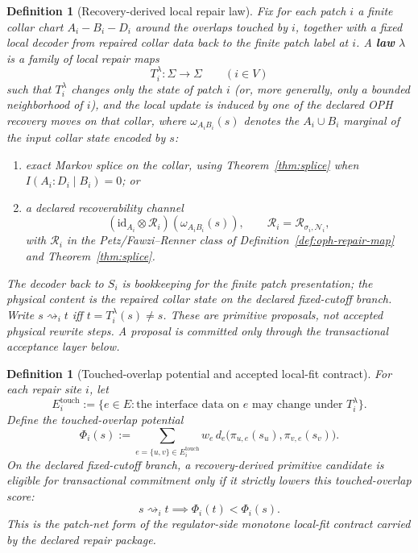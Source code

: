 \documentclass[11pt]{article}
\newtheorem{definition}[theorem]{Definition}
\theoremstyle{remark}
\theoremstyle{plain}
\begin{document}
\begin{definition}[Recovery-derived local repair law]\label{def:repair}
Fix for each patch \(i\) a finite collar chart \(A_i\!-\!B_i\!-\!D_i\) around the overlaps touched
by \(i\), together with a fixed local decoder from repaired collar data back to the finite patch
label at \(i\). A \textbf{law} \(\lambda\) is a family of local repair maps
\[
T_i^\lambda:\Sigma\to\Sigma
\qquad (i\in V)
\]
such that \(T_i^\lambda\) changes only the state of patch \(i\) (or, more generally, only a
bounded neighborhood of \(i\)), and the local update is induced by one of the declared OPH
recovery moves on that collar, where \(\omega_{A_iB_i}(s)\) denotes the \(A_i\cup B_i\) marginal
of the input collar state encoded by \(s\):
\begin{enumerate}[label=(\roman*),leftmargin=2em]
\item exact Markov splice on the collar, using Theorem~\ref{thm:splice} when
      \(I(A_i:D_i\mid B_i)=0\); or
\item a declared recoverability channel
\[
(\mathrm{id}_{A_i}\otimes \mathcal R_i)(\omega_{A_iB_i}(s)),
\qquad
\mathcal R_i=\mathcal R_{\sigma_i,\mathcal N_i},
\]
      with \(\mathcal R_i\) in the Petz/Fawzi--Renner class of
      Definition~\ref{def:oph-repair-map} and Theorem~\ref{thm:splice}.
\end{enumerate}
The decoder back to \(S_i\) is bookkeeping for the finite patch presentation; the physical content
is the repaired collar state on the declared fixed-cutoff branch. Write
\(s\rightsquigarrow_i t\) iff \(t=T_i^\lambda(s)\neq s\). These are primitive proposals, not
accepted physical rewrite steps. A proposal is committed only through the transactional acceptance
layer below.
\end{definition}

\begin{definition}[Touched-overlap potential and accepted local-fit contract]\label{def:localfit}
For each repair site \(i\), let
\[
E_i^{\mathrm{touch}}
:=
\bigl\{
e\in E:\text{the interface data on }e\text{ may change under }T_i^\lambda
\bigr\}.
\]
Define the touched-overlap potential
\[
\Phi_i(s)
:=
\sum_{e=\{u,v\}\in E_i^{\mathrm{touch}}}
w_e\, d_e\!\bigl(\pi_{u,e}(s_u),\pi_{v,e}(s_v)\bigr).
\]
On the declared fixed-cutoff branch, a recovery-derived primitive candidate is eligible for
transactional commitment only if it strictly lowers this touched-overlap score:
\[
s\rightsquigarrow_i t \implies \Phi_i(t)<\Phi_i(s).
\]
This is the patch-net form of the regulator-side monotone local-fit contract carried by the
declared repair package.
\end{definition}
\end{document}
